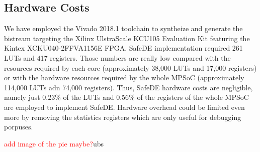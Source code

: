
\subsection{Hardware Costs}

We have employed the Vivado 2018.1 toolchain to syntheize and generate the bistream targeting the Xilinx UlstraScale KCU105 Evaluation Kit featuring the Kintex XCKU040-2FFVA1156E FPGA. SafeDE implementation required 261 LUTs and 417 registers. Those numbers are really low compared with the resources required by each core (approximately 38,000 LUTs and 17,000 registers) or with the hardware resources required by the whole MPSoC (approximately 114,000 LUTs adn 74,000 registers). Thus, SafeDE hardware costs are negligible, namely just 0.23\% of the LUTs and 0.56\% of the registers of the whole MPSoC are employed to implement SafeDE. Hardware overhead could be limited even more by removing the statistics registers which are only useful for debugging porpuses.

\textcolor{red}{add image of the pie maybe?}ubs
\bigskip


